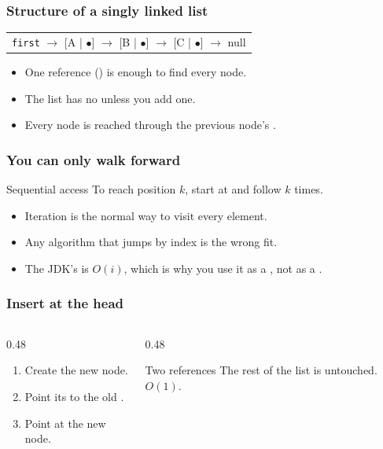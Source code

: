 \documentclass[aspectratio=169,10pt,compress]{beamer}
\begin{document}
\begin{frame}[t,fragile]\frametitle{Structure of a singly linked list}
  \begin{center}\small
  \begin{tabular}{l}
    \texttt{first} $\to$ [A | $\bullet$] $\to$ [B | $\bullet$] $\to$ [C | $\bullet$] $\to$ null
  \end{tabular}
  \end{center}
  \vspace{0.3em}
  \begin{itemize}\small
    \item One reference () is enough to find every node.
    \item The list has no  unless you add one.
    \item Every node is reached through the previous node's .
  \end{itemize}
\end{frame}

\begin{frame}[t,fragile]\frametitle{You can only walk forward}
  \begin{block}{Sequential access}
    \small
    To reach position $k$, start at  and follow
     $k$ times. 
  \end{block}
  \vspace{0.3em}
  \begin{itemize}\small
    \item Iteration is the normal way to visit every element.
    \item Any algorithm that jumps by index is the wrong fit.
    \item The JDK's  is $O(i)$, which is why
          you use it as a , not as a .
  \end{itemize}
\end{frame}

\begin{frame}[t,fragile]\frametitle{Insert at the head}
  \begin{columns}[T]
    \begin{column}{0.48\textwidth}
      \begin{enumerate}\small
        \item Create the new node.
        \item Point its  to the old .
        \item Point  at the new node.
      \end{enumerate}
    \end{column}
    \begin{column}{0.48\textwidth}
      \begin{block}{Two references}
        \small
        The rest of the list is untouched. $O(1)$.
      \end{block}
    \end{column}
  \end{columns}
\end{frame}
\end{document}

